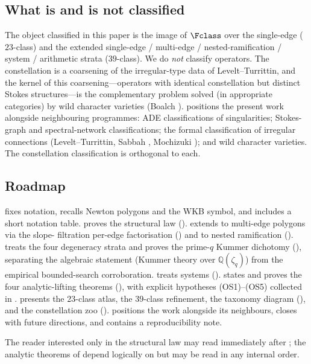 \subsection{What is and is not classified}\label{ssec:intro-scope}

The object classified in this paper is the image of $\Fclass$ over
the single-edge ($23$-class) and the extended single-edge / multi-edge
/ nested-ramification / system / arithmetic strata ($39$-class). We
do \emph{not} classify operators. The constellation is a coarsening of
the irregular-type data of Levelt--Turrittin, and the kernel of this
coarsening---operators with identical constellation but distinct
Stokes structures---is the complementary problem solved (in
appropriate categories) by wild character varieties (Boalch
\cite{boalch-stokes,boalch-wildhodge}).  positions
the present work alongside neighbouring programmes: ADE
classifications of singularities; Stokes-graph and spectral-network
classifications; the formal classification of irregular connections
(Levelt--Turrittin, Sabbah \cite{sabbah-isomon,sabbah-polarizable},
Mochizuki \cite{mochizuki-asymptotic}); and wild character varieties.
The constellation classification is orthogonal to each.

\subsection{Roadmap}\label{ssec:intro-organisation}

 fixes notation, recalls Newton polygons and the WKB
symbol, and includes a short notation table.
 proves the structural law ().
 extends to multi-edge polygons via the slope-
filtration per-edge factorisation () and to nested
ramification ().
 treats the four degeneracy strata and proves the
prime-$q$ Kummer dichotomy (), separating the algebraic
statement (Kummer theory over $\mathbb{Q}(\zeta_q)$) from the
empirical bounded-search corroboration.
 treats systems ().
 states and proves the four analytic-lifting
theorems (), with explicit
hypotheses (OS1)--(OS5) collected in .
 presents the $23$-class atlas, the $39$-class
refinement, the taxonomy diagram (), and the
constellation zoo ().
 positions the work alongside its neighbours,
 closes with future directions, and
 contains a reproducibility note.

\bigskip
The reader interested only in the structural law may read
 immediately after ; the analytic
theorems of  depend logically on
 but may be read in any internal order.
